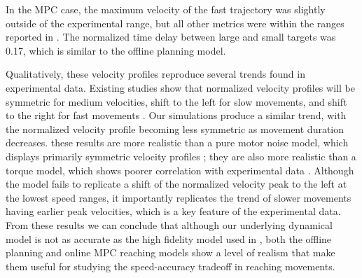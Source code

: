 \documentclass[letterpaper, 10pt, conference]{ieeeconf}
\begin{document}
In the MPC case, the maximum velocity of the fast trajectory was slightly outside of the experimental range, but all other metrics were within the ranges reported in \cite{soechting_target_size}.
The normalized time delay between large and small targets was 0.17, which is similar to the offline planning model.

Qualitatively, these velocity profiles reproduce several trends found in experimental data.
Existing studies show that normalized velocity profiles will be symmetric for medium velocities, shift to the left for slow movements, and shift to the right for fast movements \cite{asymmetric_vel_acc}\cite{human_vel_curves}. 
Our simulations produce a similar trend, with the normalized velocity profile becoming less symmetric as movement duration decreases.
these results are more realistic than a pure motor noise model, which displays primarily symmetric velocity profiles \cite{signal_dependent_motor_noise}; they are also more realistic than a torque model, which shows poorer correlation with experimental data \cite{original_paper_high_fidelity}.
Although the model fails to replicate a shift of the normalized velocity peak to the left at the lowest speed ranges, it importantly replicates the trend of slower movements having earlier peak velocities, which is a key feature of the experimental data.
From these results we can conclude that although our underlying dynamical model is not as accurate as the high fidelity model used in \cite{original_paper_high_fidelity}, both the offline planning and online MPC reaching models show a level of realism that make them useful for studying the speed-accuracy tradeoff in reaching movements.

\end{document}
